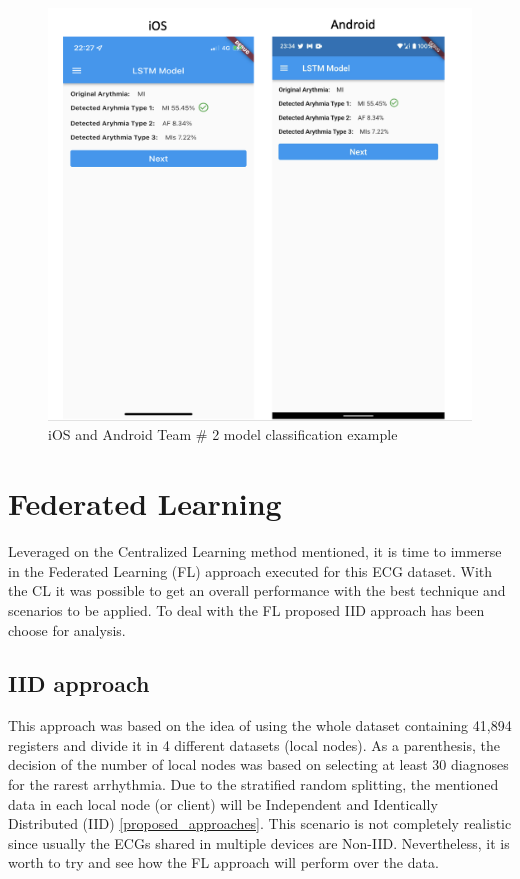 \begin{figure}[H]
\centering
\includegraphics[scale=0.4]{img/lstm_deployment.png}
\caption{iOS and Android Team \# 2 model classification example}
\label{dnn_deloyment}
\end{figure}




\section{Federated Learning} \label{5FL}

Leveraged on the Centralized Learning method mentioned, it is time to immerse in the Federated Learning (FL) approach executed for this ECG dataset. With the CL it was possible to get an overall performance with the best technique and scenarios to be applied. To deal with the FL proposed IID approach has been choose for analysis. 

\subsection{IID approach}

This approach was based on the idea of using the whole dataset containing 41,894 registers and divide it in 4 different datasets (local nodes). As a parenthesis, the decision of the number of local nodes was based on selecting at least 30 diagnoses for the rarest arrhythmia. Due to the stratified random splitting, the mentioned data in each local node (or client) will be Independent and Identically Distributed (IID) \ref{proposed_approaches}. This scenario is not completely realistic since usually the ECGs shared in multiple devices are Non-IID. Nevertheless, it is worth to try and see how the FL approach will perform over the data.

